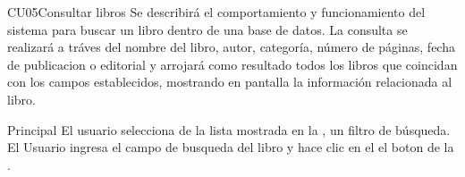
	\begin{UseCase}{CU05}{Consultar libros}{
		Se describirá el comportamiento y funcionamiento del sistema para buscar un libro dentro de una base de datos. La consulta se realizará a tráves del nombre del libro, autor, categoría, número de páginas, fecha de publicacion o editorial y arrojará como resultado todos los libros que coincidan con los campos establecidos, mostrando en pantalla la información relacionada al libro.
	}
	\end{UseCase}
	\begin{UCtrayectoria}{Principal}
		\UCpaso[\UCactor] El usuario selecciona de la lista mostrada en la , un filtro de búsqueda.
		\UCpaso[\UCactor] El Usuario ingresa el campo de busqueda del libro y hace clic en el el boton  de la .
	\end{UCtrayectoria}

